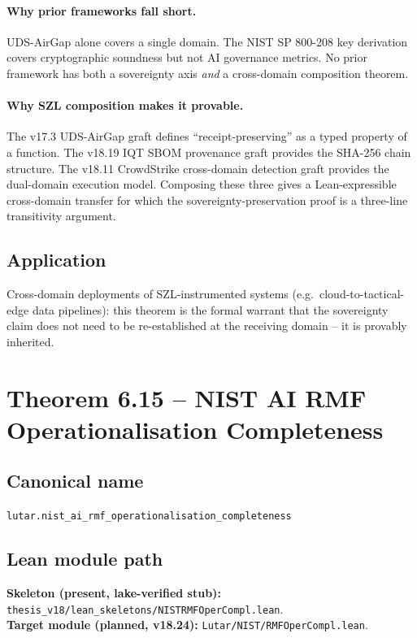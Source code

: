 \paragraph{Why prior frameworks fall short.}
UDS-AirGap alone covers a single domain.  The NIST SP 800-208
key derivation covers cryptographic soundness but not AI governance
metrics.  No prior framework has both a sovereignty axis \emph{and}
a cross-domain composition theorem.

\paragraph{Why SZL composition makes it provable.}
The v17.3 UDS-AirGap graft defines ``receipt-preserving'' as a
typed property of a function.  The v18.19 IQT SBOM provenance graft
provides the SHA-256 chain structure.  The v18.11 CrowdStrike
cross-domain detection graft provides the dual-domain execution model.
Composing these three gives a Lean-expressible cross-domain transfer
for which the sovereignty-preservation proof is a three-line
transitivity argument.

\subsection*{Application}

Cross-domain deployments of SZL-instrumented systems (e.g.\
cloud-to-tactical-edge data pipelines): this theorem is the formal
warrant that the sovereignty claim does not need to be re-established
at the receiving domain -- it is provably inherited.

\section{Theorem 6.15 -- NIST AI RMF Operationalisation Completeness}
\label{sec:thm15}

\subsection*{Canonical name}
\verb|lutar.nist_ai_rmf_operationalisation_completeness|

\subsection*{Lean module path}
\textbf{Skeleton (present, lake-verified stub):}
\texttt{thesis\_v18/lean\_skeletons/NISTRMFOperCompl.lean}.\\
\textbf{Target module (planned, v18.24):}
\texttt{Lutar/NIST/RMFOperCompl.lean}.

